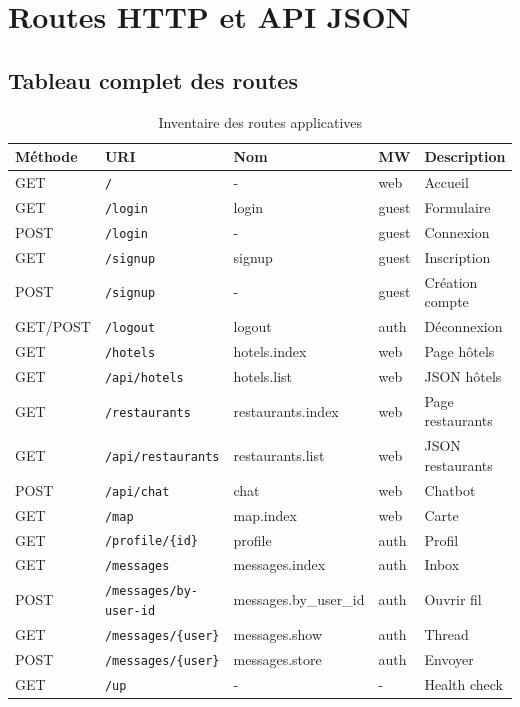 \chapter{Routes HTTP et API JSON}
\label{ch:routes}

\section{Tableau complet des routes}

\small
\begin{longtable}{@{}llllp{4.2cm}@{}}
\caption{Inventaire des routes applicatives} \label{tab:routes} \\
\toprule
\textbf{Méthode} & \textbf{URI} & \textbf{Nom} & \textbf{MW} & \textbf{Description} \\
\midrule
\endhead
GET & \texttt{/} & - & web & Accueil \\
GET & \texttt{/login} & login & guest & Formulaire \\
POST & \texttt{/login} & - & guest & Connexion \\
GET & \texttt{/signup} & signup & guest & Inscription \\
POST & \texttt{/signup} & - & guest & Création compte \\
GET/POST & \texttt{/logout} & logout & auth & Déconnexion \\
GET & \texttt{/hotels} & hotels.index & web & Page hôtels \\
GET & \texttt{/api/hotels} & hotels.list & web & JSON hôtels \\
GET & \texttt{/restaurants} & restaurants.index & web & Page restaurants \\
GET & \texttt{/api/restaurants} & restaurants.list & web & JSON restaurants \\
POST & \texttt{/api/chat} & chat & web & Chatbot \\
GET & \texttt{/map} & map.index & web & Carte \\
GET & \texttt{/profile/\{id\}} & profile & auth & Profil \\
GET & \texttt{/messages} & messages.index & auth & Inbox \\
POST & \texttt{/messages/by-user-id} & messages.by\_user\_id & auth & Ouvrir fil \\
GET & \texttt{/messages/\{user\}} & messages.show & auth & Thread \\
POST & \texttt{/messages/\{user\}} & messages.store & auth & Envoyer \\
GET & \texttt{/up} & - & - & Health check \\
\bottomrule
\end{longtable}
\normalsize

